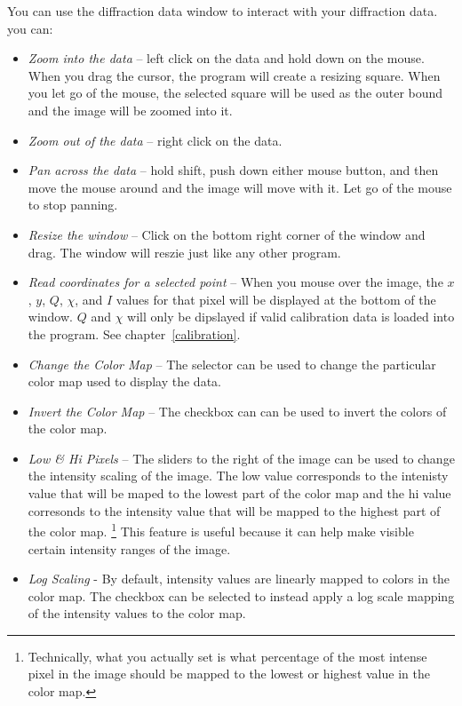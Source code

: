 You can use the diffraction data window to interact with your 
diffraction data. you can:
\begin{itemize}
    \item {\em Zoom into the data} -- left click on
    the data and hold down on the mouse. When you drag the cursor, 
    the program will create a resizing square. When you let go of the
    mouse, the selected square will be used as the outer bound and
    the image will be zoomed into it.
    \item {\em Zoom out of the data} -- right click on
    the data.
    \item {\em Pan across the data} -- hold shift, push down either mouse
    button, and then move the mouse around and the image will move 
    with it. Let go of the mouse to stop panning.
    \item {\em Resize the window} -- Click on the bottom right corner of
    the window and drag. The window will reszie just like any
    other program.  
    \item {\em Read coordinates for a selected point} -- When you
    mouse over the image, the $x$, $y$, $Q$, $\chi$, and $I$
    values for that pixel will be displayed at the bottom of the
    window. $Q$ and $\chi$ will only be dipslayed if valid calibration
    data is loaded into the program. See chapter~\ref{calibration}.
    \item {\em Change the Color Map} -- The  selector 
    can be used to change the particular color map used to display the 
    data.
    \item {\em Invert the Color Map} -- The  checkbox can 
    can be used to invert the colors of the color map.
    \item {\em Low \& Hi Pixels} -- The sliders to the right of the 
    image can be used to change the intensity scaling of the
    image. The low value corresponds to the intenisty 
    value that will be maped to the lowest part of
    the color map and the hi value corresonds to the intensity
    value that will be mapped to the highest part of the color
    map. \footnote{Technically, what you actually set is what
    percentage of the most intense pixel in the image should be 
    mapped to the lowest or highest value in the color map.}
    This feature is useful because it can help make visible certain
    intensity ranges of the image.
    \item {\em Log Scaling} - By default, intensity values are linearly 
    mapped to colors in the color map. The  checkbox 
    can be selected to instead apply a log scale mapping of the intensity 
    values to the color map.
\end{itemize}

